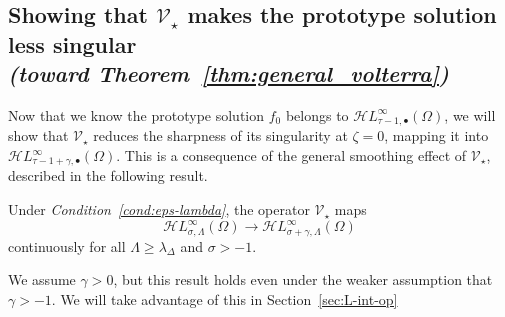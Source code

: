 \documentclass[review]{siamart220329}
\newcommand{\singexp}[2]{\mathcal{H}L^\infty_{#1, #2}}
\newcommand{\singexpalg}[1]{\singexp{#1}{\bullet}}
\newcommand{\softpart}{\mathcal{V}_\star}
\newcommand{\solproto}{f_0}
\newcommand{\domain}{\Omega}
\begin{document}
\subsection{Showing that $\softpart$ makes the prototype solution less singular \\ \textit{(toward Theorem~\ref{thm:general_volterra})}}\label{sec:image under soft_part}
Now that we know the prototype solution $\solproto$ belongs to $\singexpalg{\tau-1}(\domain)$, we will show that $\softpart$ reduces the sharpness of its singularity at $\zeta = 0$, mapping it into $\singexpalg{\tau-1+\gamma}(\domain)$. This is a consequence of the general smoothing effect of $\softpart$, described in the following result.

\begin{proposition}\label{prop:smoothing}
Under {\em Condition~\eqref{cond:eps-lambda}}, the operator $\softpart$ maps
\[ \singexp{\sigma}{\Lambda}(\Omega) \to \singexp{\sigma+\gamma}{\Lambda}(\Omega) \]
continuously for all $\Lambda\geq \lambda_{\Delta}$ and $\sigma>-1$.
\end{proposition}
\begin{rmk}
We assume $\gamma > 0$, but this result holds even under the weaker assumption that $\gamma > -1$. We will take advantage of this in Section~\ref{sec:L-int-op}
\end{rmk}
\end{document}
